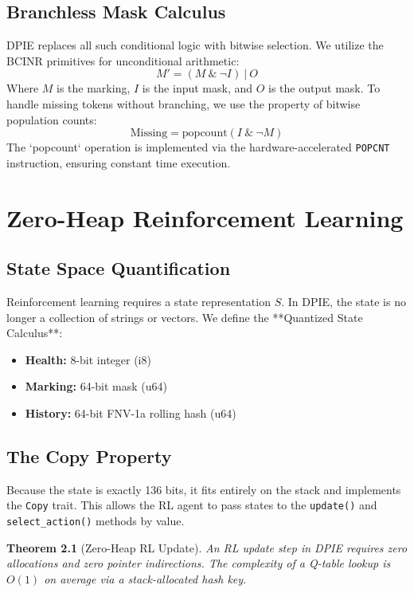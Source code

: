 \documentclass[12pt,a4paper]{report}
\newtheorem{theorem}{Theorem}
\begin{document}
\section{Branchless Mask Calculus}
DPIE replaces all such conditional logic with bitwise selection. We utilize the BCINR primitives for unconditional arithmetic:
\begin{equation}
M' = (M \ \& \ \neg I) \ | \ O
\end{equation}
Where $M$ is the marking, $I$ is the input mask, and $O$ is the output mask. To handle missing tokens without branching, we use the property of bitwise population counts:
\begin{equation}
\text{Missing} = \text{popcount}(I \ \& \ \neg M)
\end{equation}
The `popcount` operation is implemented via the hardware-accelerated \texttt{POPCNT} instruction, ensuring constant time execution.

\chapter{Zero-Heap Reinforcement Learning}
\section{State Space Quantification}
Reinforcement learning requires a state representation $S$. In DPIE, the state is no longer a collection of strings or vectors. We define the **Quantized State Calculus**:
\begin{itemize}
    \item \textbf{Health:} 8-bit integer (i8)
    \item \textbf{Marking:} 64-bit mask (u64)
    \item \textbf{History:} 64-bit FNV-1a rolling hash (u64)
\end{itemize}

\section{The Copy Property}
Because the state is exactly 136 bits, it fits entirely on the stack and implements the \texttt{Copy} trait. This allows the RL agent to pass states to the \texttt{update()} and \texttt{select\_action()} methods by value.
\begin{theorem}[Zero-Heap RL Update]
An RL update step in DPIE requires zero allocations and zero pointer indirections. The complexity of a Q-table lookup is $O(1)$ on average via a stack-allocated hash key.
\end{theorem}
\end{document}
